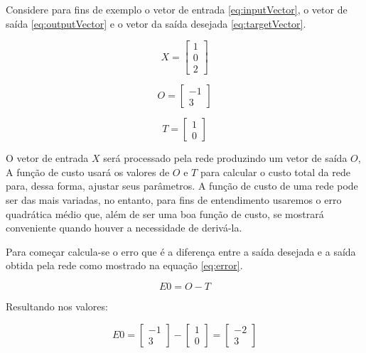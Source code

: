 \begin{apendicesenv}
		\par Considere  para fins de exemplo o vetor de entrada \ref{eq:inputVector}, o vetor de saída \ref{eq:outputVector} e o vetor da saída desejada \ref{eq:targetVector}.
		
		\begin{equation}\label{eq:inputVector}
 		 X = \begin{bmatrix}
			 	1 \\
			 	0 \\
			 	2  
			 \end{bmatrix}
		\end{equation}
	
		\begin{equation}\label{eq:outputVector}
			O = \begin{bmatrix}
				-1 \\
				3 
			\end{bmatrix}
		\end{equation}
	
		\begin{equation}\label{eq:targetVector}
		T = \begin{bmatrix}
			1 \\
			0 
		\end{bmatrix}
		\end{equation}
		
		\par O vetor de entrada $X$ será processado pela rede produzindo um vetor de saída $O$, A função de custo usará os valores de $O$ e $T$ para calcular o custo total da rede para, dessa forma, ajustar seus parâmetros. A função de custo de uma rede pode ser das mais variadas, no entanto, para fins de entendimento usaremos o erro quadrática médio que, além de ser uma boa função de custo, se mostrará conveniente quando houver a necessidade de derivá-la.
		
		\par Para começar calcula-se o erro que é a diferença entre a saída desejada e a saída obtida pela rede como mostrado na equação \ref{eq:error}.
		
		\begin{equation}\label{eq:error}
			E0 = O - T
		\end{equation}
	
		\par Resultando nos valores:
		
		\begin{equation}\label{eq:outputVector2}
			E0 = \begin{bmatrix}
					-1 \\
					3 
			\end{bmatrix}-\begin{bmatrix}
				1 \\
				0 
			\end{bmatrix} =\begin{bmatrix}
				-2 \\
				3 
			\end{bmatrix}
		\end{equation}
	

\end{apendicesenv}
